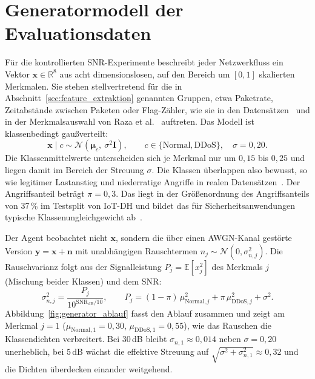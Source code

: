 \section{Generatormodell der Evaluationsdaten}
\label{sec:generatormodell}

Für die kontrollierten SNR-Experimente beschreibt jeder Netzwerkfluss ein Vektor $\mathbf{x}\in\mathbb{R}^{8}$ aus acht dimensionslosen, auf den Bereich um $[0,1]$ skalierten Merkmalen. Sie stehen stellvertretend für die in Abschnitt~\ref{sec:feature_extraktion} genannten Gruppen, etwa Paketrate, Zeitabstände zwischen Paketen oder Flag-Zähler, wie sie in den Datensätzen~\autocite{mittalDDoSAT2022DistributedDenial2023, saifIoTDHDatasetClassification2024} und in der Merkmalsauswahl von Raza et al.~\autocite{razaFeatureSelectionBasedDDoSAttack2024} auftreten. Das Modell ist klassenbedingt gaußverteilt:
\begin{equation}
	\mathbf{x}\mid c \sim \mathcal{N}\!\left(\boldsymbol{\mu}_c,\ \sigma^2\mathbf{I}\right),\qquad c\in\{\text{Normal},\text{DDoS}\},\quad \sigma=0{,}20 .
\end{equation}
Die Klassenmittelwerte unterscheiden sich je Merkmal nur um $0{,}15$ bis $0{,}25$ und liegen damit im Bereich der Streuung $\sigma$. Die Klassen überlappen also bewusst, so wie legitimer Lastanstieg und niederratige Angriffe in realen Datensätzen~\autocite{mittalDDoSAT2022DistributedDenial2023}. Der Angriffsanteil beträgt $\pi=0{,}3$. Das liegt in der Größenordnung des Angriffsanteils von 37\,\% im Testsplit von \mbox{IoT-DH} und bildet das für Sicherheitsanwendungen typische Klassenungleichgewicht ab~\autocite{saifIoTDHDatasetClassification2024}.

Der Agent beobachtet nicht $\mathbf{x}$, sondern die über einen AWGN-Kanal gestörte Version $\mathbf{y}=\mathbf{x}+\mathbf{n}$ mit unabhängigen Rauschtermen $n_j\sim\mathcal{N}(0,\sigma_{n,j}^2)$. Die Rauschvarianz folgt aus der Signalleistung $P_j=\mathbb{E}[x_j^2]$ des Merkmals $j$ (Mischung beider Klassen) und dem SNR:
\begin{equation}
	\sigma_{n,j}^2=\frac{P_j}{10^{\mathrm{SNR_{dB}}/10}},\qquad P_j=(1-\pi)\,\mu_{\text{Normal},j}^2+\pi\,\mu_{\text{DDoS},j}^2+\sigma^2 .
\end{equation}
Abbildung~\ref{fig:generator_ablauf} fasst den Ablauf zusammen und zeigt am Merkmal $j=1$ ($\mu_{\text{Normal},1}=0{,}30$, $\mu_{\text{DDoS},1}=0{,}55$), wie das Rauschen die Klassendichten verbreitert. Bei $30$\,dB bleibt $\sigma_{n,1}\approx0{,}014$ neben $\sigma=0{,}20$ unerheblich, bei $5$\,dB wächst die effektive Streuung auf $\sqrt{\sigma^2+\sigma_{n,1}^2}\approx0{,}32$ und die Dichten überdecken einander weitgehend.


